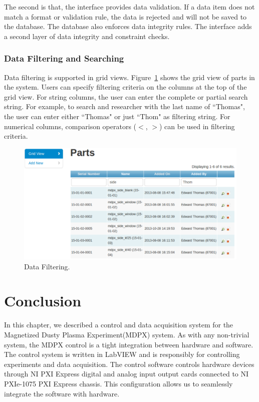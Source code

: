 The second is that, the interface provides data validation. If a data item does not match a format or validation rule, the data is rejected and will not be saved to the database. The database also enforces data integrity rules. The interface adds a second layer of data integrity and constraint checks.

\subsubsection{Data Filtering and Searching}

Data filtering is supported in grid views. Figure~\ref{fig:grid_filter} shows the grid view of parts in the system. Users can specify filtering criteria on the columns at the top of the grid view. For string columns, the user can enter the complete or partial search string. For example, to search and researcher with the last name of ``Thomas", the user can enter either ``Thomas" or just ``Thom" as filtering string. For numerical columns, comparison operators ($<$, $>$) can be used in filtering criteria.

\begin{figure}[h!]
\centering
\includegraphics[width=6in]{grid_filter.pdf}
\caption{Data Filtering.\label{fig:grid_filter}}
\end{figure}


\section{Conclusion}\label{mdpx-sec-conclusion}
In this chapter, we described a control and data acquisition system for the Magnetized Dusty Plasma Experiment(MDPX) system. As with any non-trivial system, the MDPX control is a tight integration between hardware and software. The control system is written in LabVIEW and is responsibly for controlling experiments and data acquisition. The control software controls hardware devices through NI PXI Express digital and analog input output cards connected to NI PXIe-1075 PXI Express chassis. This configuration allows us to seamlessly integrate the software with hardware.

